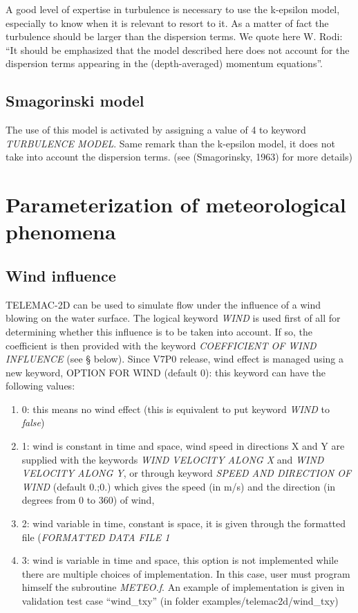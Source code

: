  A good level of expertise in turbulence is necessary to use the k-epsilon model, especially to know when it is relevant to resort to it. As a matter of fact the turbulence should be larger than the dispersion terms. We quote here W. Rodi: ``It should be emphasized that the model described here does not account for the dispersion terms appearing in the (depth-averaged) momentum equations''.


\subsection{ Smagorinski model}

 The use of this model is activated by assigning a value of 4 to keyword \textit{TURBULENCE MODEL}. Same remark than the k-epsilon model, it does not take into account the dispersion terms. (see (Smagorinsky, 1963) for more details)


\section{ Parameterization of meteorological phenomena}


\subsection{ Wind influence}

 TELEMAC-2D can be used to simulate flow under the influence of a wind blowing on the water surface. The logical keyword  \textit{WIND} is used first of all for determining whether this influence is to be taken into account. If so, the coefficient is then provided with the keyword \textit{COEFFICIENT OF WIND INFLUENCE} (see {\S} below). Since V7P0 release, wind effect is managed using a new keyword, OPTION FOR WIND (default 0): this keyword can have the following values:

\begin{enumerate}
\item  0: this means no wind effect (this is equivalent to put keyword\textit{ WIND }to \textit{false})

\item 1: wind is constant in time and space, wind speed in directions X and Y are supplied with the keywords \textit{WIND VELOCITY ALONG X} and \textit{WIND VELOCITY ALONG Y}, or through keyword\textit{ SPEED AND DIRECTION OF WIND }(default 0.;0.) which gives the speed (in m/s) and the direction (in degrees from 0 to 360) of wind,

\item  2: wind variable in time, constant is space, it is given through the formatted file (\textit{FORMATTED DATA FILE 1}

\item  3: wind is variable in time and space, this option is not implemented while there are multiple choices of implementation. In this case, user must program himself the subroutine \textit{METEO.f}. An example of implementation is given in validation test case ``wind\_txy'' (in folder examples/telemac2d/wind\_txy)
\end{enumerate}

